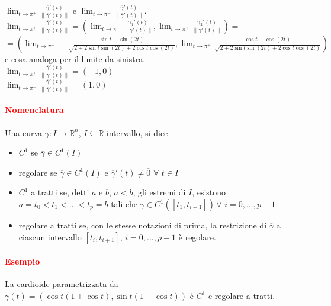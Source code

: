 \documentclass{article}
\newcommand{\R}{\mathbb{R}}
\begin{document}
$\lim_{t \rightarrow \pi^+}\frac{\overline{\gamma}'(t)}{\|\overline{\gamma}'(t)\|}$ e $\lim_{t \rightarrow \pi^-}\frac{\overline{\gamma}'(t)}{\|\overline{\gamma}'(t)\|}$.\\
$\lim_{t \rightarrow \pi^+} \frac{\overline{\gamma}'(t)}{\|\overline{\gamma}'(t)\|}=\left( \lim_{t\rightarrow \pi^+} \frac{\gamma_1'(t)}{\| \overline{\gamma}'(t)\|},\lim_{t\rightarrow \pi^+} \frac{\gamma_2'(t)}{\| \overline{\gamma}'(t) \|} \right)=$\\$=\left( \lim_{t \rightarrow \pi^+} -\frac{\sin t +\sin(2t)}{\sqrt{2+2\sin t \sin(2t)+2\cos t \cos(2t)}}, \lim_{t \rightarrow \pi^+} \frac{\cos t + \cos (2t)}{\sqrt{2+2\sin t \sin(2t)+2\cos t \cos(2t)}}\right)$\\
e cosa analoga per il limite da sinistra.\\
$\lim_{t \rightarrow \pi^+}\frac{\overline{\gamma}'(t)}{\|\overline{\gamma}'(t)\|}=(-1,0)$\\
$\lim_{t \rightarrow \pi^-}\frac{\overline{\gamma}'(t)}{\|\overline{\gamma}'(t)\|}=(1,0)$\\

\paragraph{\textcolor{red}{Nomenclatura}}
Una curva $\overline{\gamma}: I \rightarrow \R^n$, $I \subseteq \R$ intervallo, si dice
\begin{itemize}
    \item $C^1$ se $\overline{\gamma} \in C^1(I)$
    \item regolare se $\overline{\gamma} \in C^1(I)$ e $\overline{\gamma}'(t)\neq \overline{0} \,\, \forall \,\, t \in I$
    \item $C^1$ a tratti se, detti $a$ e $b$, $a < b$, gli estremi di $I$, esistono $a=t_0 <t_1<...<t_p=b$ tali che $\overline{\gamma} \in C^1([t_1,t_{i+1}]) \,\forall\,\, i =0,..., p-1$
    \item regolare a tratti se, con le stesse notazioni di prima, la restrizione di $\overline{\gamma}$ a ciascun intervallo  $[t_i,t_{i+1}]$, $i=0,...,p-1$ è regolare.
\end{itemize}

\paragraph{\textcolor{red}{Esempio}}
La cardioide parametrizzata da $\overline{\gamma}(t)=(\cos t (1+\cos t), \sin t (1+\cos t))$ è $C^1$ e regolare a tratti.
\end{document}
